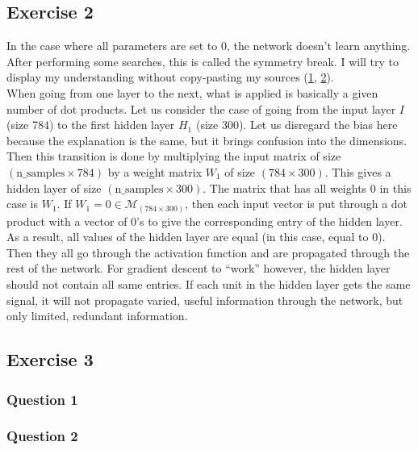 \documentclass[12pt]{article}
\begin{document}
\subsection{Exercise 2}
In the case where all parameters are set to 0, the network doesn't learn anything. After performing some searches, this is called the symmetry break. I will try to display my understanding without copy-pasting my sources (\href{https://stats.stackexchange.com/questions/45087/why-doesnt-backpropagation-work-when-you-initialize-the-weights-the-same-value}{1}, \href{https://stackoverflow.com/questions/20027598/why-should-weights-of-neural-networks-be-initialized-to-random-numbers}{2}). \\
When going from one layer to the next, what is applied is basically a given number of dot products. Let us consider the case of going from the input layer $I$ (size 784) to the first hidden layer $H_1$ (size 300). Let us disregard the bias here because the explanation is the same, but it brings confusion into the dimensions. Then this transition is done by multiplying the input matrix of size $(\text{n\_samples} \times 784)$ by a weight matrix $W_1$ of size $(784 \times 300)$. This gives a hidden layer of size $(\text{n\_samples} \times 300)$. The matrix that has all weights 0 in this case is $W_1$. If $W_1 = 0 \in \mathcal{M}_{(784 \times 300)}$, then each input vector is put through a dot product with a vector of $0$'s to give the corresponding entry of the hidden layer. As a result, all values of the hidden layer are equal (in this case, equal to 0). Then they all go through the activation function and are propagated through the rest of the network. For gradient descent to ``work'' however, the hidden layer should not contain all same entries. If each unit in the hidden layer gets the same signal, it will not propagate varied, useful information through the network, but only limited, redundant information.


\subsection{Exercise 3}
\subsubsection{Question 1}

\subsubsection{Question 2}
\end{document}
